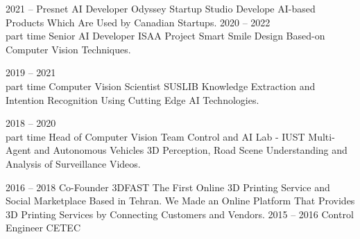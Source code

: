 \documentclass[9pt]{developercv} %
\begin{document}
\begin{entrylist}
	\entry
		{2021 -- Presnet}
		{AI Developer}
		{Odyssey Startup Studio}
		{Develope AI-based Products Which Are Used by Canadian Startups.}
	\entry
		{2020 -- 2022\\\footnotesize{part time}}
		{Senior AI Developer}
		{ISAA Project}
		{Smart Smile Design Based-on Computer Vision Techniques.}

	\entry
		{2019 -- 2021\\\footnotesize{part time}}
		{Computer Vision Scientist}
		{SUSLIB}
		{Knowledge Extraction and Intention Recognition Using Cutting Edge AI Technologies.}

	\entry
		{2018 -- 2020\\\footnotesize{part time}}
		{Head of Computer Vision Team}
		{Control and AI Lab - IUST}
		{Multi-Agent and Autonomous Vehicles 3D Perception, Road Scene Understanding and Analysis of Surveillance Videos.}

	\entry
		{2016 -- 2018}
		{Co-Founder}
		{3DFAST}
		{The First Online 3D Printing Service and Social Marketplace Based in Tehran. We Made an Online Platform That Provides 3D Printing Services by Connecting Customers and Vendors.}
	\entry
		{2015 -- 2016}
		{Control Engineer}
		{CETEC}
		{ }		
		
\end{entrylist}


\end{document}
